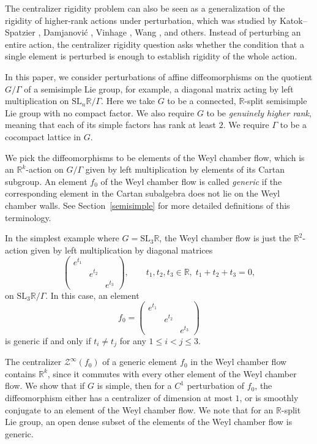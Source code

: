 \documentclass[11pt]{amsart}
\numberwithin{equation}{section}
\newcommand{\R}{\mathbb{R}}
\theoremstyle{plain}
\begin{document}
The centralizer rigidity problem can also be seen as a generalization of the rigidity of higher-rank actions under perturbation, which was studied by Katok--Spatzier \cite{KSpat}, Damjanović \cite{DK}, Vinhage \cite{Vinhage}, Wang \cite{VinWang}, and others. Instead of perturbing an entire action, the centralizer rigidity question asks whether the condition that a single element is perturbed is enough to establish rigidity of the whole action.

In this paper, we consider perturbations of affine diffeomorphisms on the quotient $G/\Gamma$ of a semisimple Lie group, for example, a diagonal matrix acting by left multiplication on $\mathrm{SL}_n\R/\Gamma$. Here we take $G$ to be a connected, $\R$-split semisimple Lie group with no compact factor. We also require $G$ to be \emph{genuinely higher rank}, meaning that each of its simple factors has rank at least $2$. We require $\Gamma$ to be a cocompact lattice in $G$.

We pick the diffeomorphisms to be elements of the Weyl chamber flow, which is an $\R^k$-action on $G/\Gamma$ given by left multiplication by elements of its Cartan subgroup. An element $f_0$ of the Weyl chamber flow is called \emph{generic} if the corresponding element in the Cartan subalgebra does not lie on the Weyl chamber walls. See Section~\ref{semisimple} for more detailed definitions of this terminology.

In the simplest example where $G=\mathrm{SL}_3\R$, the Weyl chamber flow is just the $\R^2$-action given by left multiplication by diagonal matrices
\[
\begin{pmatrix}
 e^{t_1} &&\\ &e^{t_2}&\\ &&e^{t_3}
\end{pmatrix},
\qquad t_1,t_2,t_3\in \R,\; t_1+t_2+t_3=0,
\]
on $\mathrm{SL}_3\R/\Gamma$. In this case, an element
\[
f_0=\begin{pmatrix}
 e^{t_1} &&\\ &e^{t_2}&\\ &&e^{t_3}
\end{pmatrix}
\]
is generic if and only if $t_i\neq t_j$ for any $1\le i<j\le 3$.

The centralizer $\mathcal{Z}^\infty(f_0)$ of a generic element $f_0$ in the Weyl chamber flow contains $\R^k$, since it commutes with every other element of the Weyl chamber flow. We show that if $G$ is simple, then for a $C^1$ perturbation of $f_0$, the diffeomorphism either has a centralizer of dimension at most $1$, or is smoothly conjugate to an element of the Weyl chamber flow. We note that for an $\R$-split Lie group, an open dense subset of the elements of the Weyl chamber flow is generic. 
\end{document}
